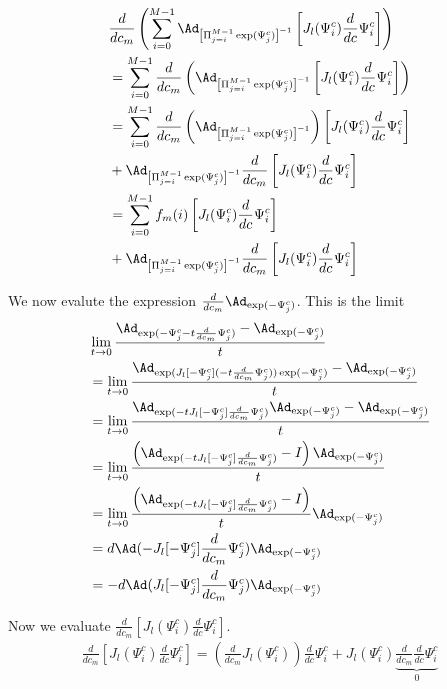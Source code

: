 \documentclass[12pt]{article}
\begin{document}
\[
  \begin{aligned}
    &\frac{d}{dc_m}\left(\sum_{i=0}^{M-1}\Ad_{\left[\Pi_{j=i}^{M-1} \exp(\Psi^c_j)\right]^{-1}}\left[J_l(\Psi^c_i)\frac{d}{dc}\Psi^c_i \right]\right) \\
    &= \sum_{i=0}^{M-1}\frac{d}{dc_m}\left(\Ad_{\left[\Pi_{j=i}^{M-1} \exp(\Psi^c_j)\right]^{-1}}\left[J_l(\Psi^c_i)\frac{d}{dc}\Psi^c_i \right]\right) \\
    &= \sum_{i=0}^{M-1}\frac{d}{dc_m}\left(\Ad_{\left[\Pi_{j=i}^{M-1} \exp(\Psi^c_j)\right]^{-1}}\right)\left[J_l(\Psi^c_i)\frac{d}{dc}\Psi^c_i \right] \\
    &+  \Ad_{\left[\Pi_{j=i}^{M-1} \exp(\Psi^c_j)\right]^{-1}}\frac{d}{dc_m}\left[J_l(\Psi^c_i)\frac{d}{dc}\Psi^c_i \right]\\
    &= \sum_{i=0}^{M-1}f_m(i)\left[J_l(\Psi^c_i)\frac{d}{dc}\Psi^c_i \right] \\
    &+  \Ad_{\left[\Pi_{j=i}^{M-1} \exp(\Psi^c_j)\right]^{-1}}\frac{d}{dc_m}\left[J_l(\Psi^c_i)\frac{d}{dc}\Psi^c_i \right]\\
  \end{aligned}
\]



We now evalute the expression $\frac{d}{dc_m}\Ad_{\exp(-\Psi^c_j)}$. This is the limit
\[
\begin{aligned}
  &\lim_{t \rightarrow 0}\frac{\Ad_{\exp(-\Psi^c_j - t \frac{d}{dc_m}\Psi^c_j)} - \Ad_{\exp(-\Psi^c_j)} }{ t } \\
  &= \lim_{t \rightarrow 0}\frac{\Ad_{\exp(J_l[-\Psi^c_j](-t\frac{d}{dc_m}\Psi^c_j))\exp(-\Psi^c_j)} - \Ad_{\exp(-\Psi^c_j)} }{ t } \\
  &= \lim_{t \rightarrow 0}\frac{\Ad_{\exp(-t J_l[-\Psi^c_j]\frac{d}{dc_m}\Psi^c_j)}\Ad_{\exp(-\Psi^c_j)} - \Ad_{\exp(-\Psi^c_j)} }{ t } \\
  &= \lim_{t \rightarrow 0}\frac{\left(\Ad_{\exp(-t J_l[-\Psi^c_j]\frac{d}{dc_m}\Psi^c_j)} - I\right)\Ad_{\exp(-\Psi^c_j)}  }{ t } \\
  &= \lim_{t \rightarrow 0}\frac{\left(\Ad_{\exp(-t J_l[-\Psi^c_j]\frac{d}{dc_m}\Psi^c_j)} - I\right)}{t}\Ad_{\exp(-\Psi^c_j)} \\
  &= d\Ad(- J_l[-\Psi^c_j]\frac{d}{dc_m}\Psi^c_j)\Ad_{\exp(-\Psi^c_j)} \\
  &= -d\Ad(J_l[-\Psi^c_j]\frac{d}{dc_m}\Psi^c_j)\Ad_{\exp(-\Psi^c_j)} \\
\end{aligned}
\]

Now we evaluate $\frac{d}{dc_m}\left[J_l(\Psi^c_i)\frac{d}{dc}\Psi^c_i \right]$.
\[
  \begin{aligned}
    \frac{d}{dc_m}\left[J_l(\Psi^c_i)\frac{d}{dc}\Psi^c_i \right] = \left(\frac{d}{dc_m}J_l(\Psi^c_i)\right)\frac{d}{dc}\Psi^c_i + J_l(\Psi^c_i)\underbrace{\frac{d}{dc_m}\frac{d}{dc}\Psi^c_i}_0 \\
  \end{aligned}
\]
\end{document}
